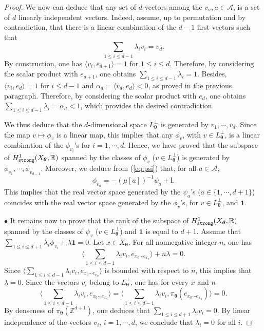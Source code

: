 \documentclass{article}
\theoremstyle{definition}
\newcommand{\btheta}{\boldsymbol{\theta}}
\begin{document}
\begin{proof}
We now can deduce   that any set of $d$ vectors among the $v_a, a\in\mathcal A$, is a set of $d$ linearly independent vectors.
 Indeed, assume, up to permutation and  by contradiction, that   there is a linear combination of the $d-1$ first vectors such that
 $$\sum_{ 1 \leq i \leq d-1}  \lambda_i v_i=v_{d}.$$
 By construction,  one has $\langle v_i, e_{d+1} \rangle = 1$ for $  1\leq i \leq d$. Therefore, by considering the scalar product with $e_{d+1}$, one obtains $\sum_{ 1 \leq i \leq d-1} \lambda_i=1$.
 Besides, $\langle v_i, e_{d} \rangle = 1$ for $i \leq d-1$ and  $ \alpha_{d}=\langle v_{d}, e_{d} \rangle  < 0$,   as proved in the previous paragraph.   Therefore,
  by considering the scalar product with $e_{d}$, one obtains
 $\sum_{ 1 \leq i \leq d-1} \lambda_i = \alpha_{d } <1  $, which  provides the  desired  contradiction.
 
We thus deduce that   the  $d$-dimensional space $ L_{\btheta}^\perp $ is generated by $v_1, \cdots ,v_{d}$.
 Since the map $v \mapsto \phi_v$ is a linear map, this implies that any $\phi_v$, with  $v \in L_{\btheta}^\perp$, is a linear combination of  the $\phi_{v_i}$'s for $i=1, \cdots, d$.
Hence,  we have proved that the subspace of $H^1_{\tt{strong}}(X_{\btheta},\mathbb R)$ spanned by the   classes
of $\phi_v$ ($v \in L_{\btheta}^\perp$) is generated by  $\phi_{v_1}, \cdots ,\phi_{v_{d-1}}$. 
 Moreover, we deduce  from  (\ref{eq:psi}) that, for all $a \in {\mathcal A}$,
 \begin{equation}\label{eq1}
 \phi_{v_a} =- (\mu[a])^{-1} \psi_a +  {\mathbf l}.
 \end{equation}
This  implies that  the real  vector space  generated by  the  $\psi_a$'s  ($a \in \{1, \cdots, d+1\}$)
coincides  with the real vector  space generated by the $\phi_v$'s,  for $v \in L_{\btheta}^{\perp}$, and  $\mathbf 1$.


\bigskip

$\bullet$  It remains  now to prove  that  the rank 
of   the subspace of $H^1_{\tt{strong}}(X_{\btheta},\mathbb R)$ spanned by the   classes
of $\psi_v$ ($v \in L_{\btheta}^\perp$) and ${\mathbf 1}$ is equal to $d+1$.
 Assume that $ \sum_{ 1 \leq i \leq d+1}  \lambda_i  \phi_{v_i} +\lambda  {\mathbf 1}=0$. 
 Let $x \in X_{\btheta}$. For all  nonnegative integer $n$, one has 
$$\langle   \sum_{ 1 \leq i \leq d-1}  \lambda_i  {v_i}  ,  e_{x_0 \cdots e_{x_n}}  \rangle + n \lambda= 0.$$ Since  $\langle   \sum_{ 1 \leq i \leq d-1}  \lambda_i  {v_i}  ,  e_{x_0 \cdots e_{x_n}}  \rangle$ is bounded   with respect to $n$, this implies that $\lambda=0$.
Since the vectors $v_i$ belong to $L_{\btheta}^ \perp$,  one has  for every $x$ and $n$
$$\langle   \sum_{ 1 \leq i \leq d-1}  \lambda_i  {v_i}  ,  e_{x_0 \cdots e_{x_n}}  \rangle =\langle   \sum_{ 1 \leq i \leq d-1}  \lambda_i  {v_i}  ,  \pi _{\btheta} (e_{x_0 \cdots e_{x_n}})  \rangle = 0.$$ By denseness of $\pi _{\btheta}( {\mathbb Z^{d+1}})$, one  deduces that 
 $ \sum_  { 1 \leq i \leq d+1}  \lambda_i  {v_i}=0$.  
By linear independence of  the  vectors  $v_i$,  $i=1, \cdots, d$,   we conclude that  $\lambda_i=0$ for all $i$.
  

\end{proof}
\end{document}
